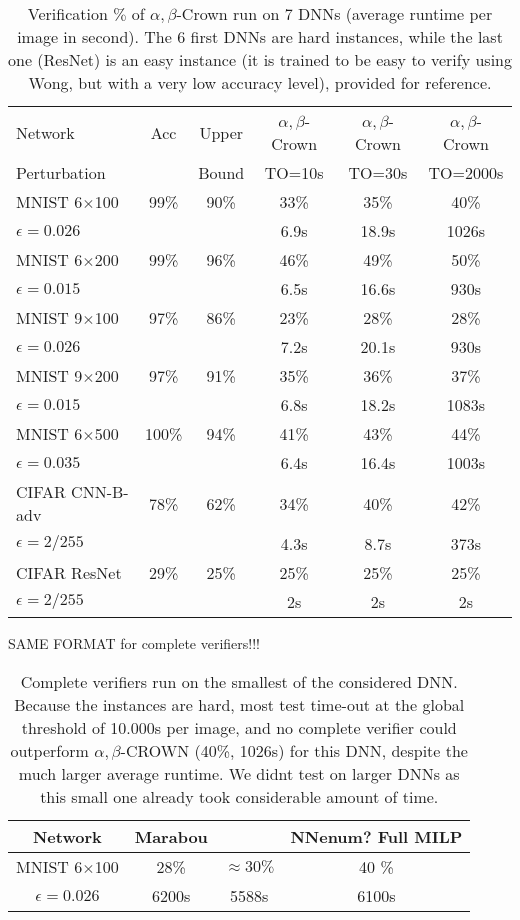 \documentclass{article} %
\theoremstyle{definition}
\begin{document}
\begin{table}
	\centering
	\begin{tabular}{||l|c|c||c|c|c||}
		\hline
		Network & Acc & Upper  & $\alpha,\beta$-Crown& $\alpha,\beta$-Crown & $\alpha,\beta$-Crown \\ 
		Perturbation &   & Bound & TO=10s & TO=30s & TO=2000s\\ \hline
		MNIST 6$\times$100 & 99\% & 90\% & 33\% & 35\% & 40\%   \\
		$\epsilon = 0.026$ &  &  & 6.9s &  18.9s &  1026s  \\  \hline
		MNIST 6$\times$200 & 99\%  & 96\%  & 46\%  & 49\%  & 50\%   \\ 
		$\epsilon = 0.015$ & &  & 6.5s &  16.6s &  930s  \\  \hline
		MNIST 9$\times$100 & 97\%  & 86\%  & 23\%  & 28\%  & 28\%   \\
		$\epsilon = 0.026$ &  &  & 7.2s &  20.1s &  930s  \\  \hline
		MNIST 9$\times$200 & 97\%  & 91\%  & 35\%  & 36\%  & 37\%   \\ 
		$\epsilon = 0.015$ & &  & 6.8s &  18.2s &  1083s  \\  \hline
		MNIST 6$\times$500 & 100\%  & 94\%  & 41\%  & 43\%  & 44\%   \\ 
		$\epsilon = 0.035$ & &  & 6.4s &  16.4s &  1003s  \\  \hline
		CIFAR CNN-B-adv & 78\%  & 62\%  &  34\% & 40\%  & 42\%   \\
		$\epsilon = 2/255$&  &  & 4.3s & 8.7s & 373s  \\ \hline \hline
		CIFAR ResNet & 29\%  & 25\%  & 25\%  & 25\%  & 25\%   \\
		$\epsilon = 2/255$ &  &  & 2s & 2s & 2s  \\ \hline
	\end{tabular}
	\caption{Verification $\%$ of $\alpha,\beta$-Crown run on 7 DNNs (average runtime per image in second). The 6 first DNNs are hard instances, while the last one (ResNet) is an easy instance (it is trained to be easy to verify using Wong, but with a very low accuracy level), provided for reference.}
	\label{table_beta}
\end{table}


SAME FORMAT for complete verifiers!!!

\begin{table}
	\centering
	\begin{tabular}{||c||c|c|c||}
		\hline
		Network &  Marabou  & & NNenum? Full MILP  \\ \hline
		MNIST 6$\times$100 & 28\% & $\approx 30\%$ & 40 \%    \\ \hline
		$\epsilon = 0.026$ & 6200s &  5588s & 6100s
		  \\  \hline
	\end{tabular}
\caption{Complete verifiers run on the smallest of the considered DNN. 
Because the instances are hard, most test time-out at the global threshold of 10.000s per image, and no complete verifier could outperform 
$\alpha,\beta$-CROWN (40\%, 1026s) for this DNN, despite the much larger average runtime. We didnt test on larger DNNs as this small one already took considerable amount of time.}
\label{table_complete}
\end{table}
\end{document}
